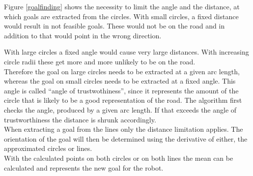 Figure \ref{goalfinding} shows the necessity to limit the angle and the distance, at which goals are extracted from the circles. With small circles, a fixed distance would result in not feasible goals. These would not be on the road and in addition to that would point in the wrong direction.

With large circles a fixed angle would cause very large distances. With increasing circle radii these get more and more unlikely to be on the road.\\

Therefore the goal on large circles needs to be extracted at a given arc length, whereas the goal on small circles needs to be extracted at a fixed angle. This angle is called ``angle of trustwothiness'', since it represents the amount of the circle that is likely to be a good representation of the road. The algorithm first checks the angle, produced by a given arc length. If that exceeds the angle of trustworthiness the distance is shrunk accordingly.\\

When extracting a goal from the lines only the distance limitation applies. The orientation of the goal will then be determined using the derivative of either, the approximated circles or lines.\\

With the calculated points on both circles or on both lines the mean can be calculated and represents the new goal for the robot.

